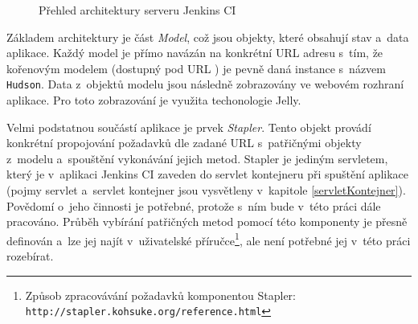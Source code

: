             \begin{figure}[ht]
                \begin{center}
                    \caption{Přehled architektury serveru Jenkins CI \cite{architectureOverview}}
                    \label{imgJenkinsArchitecture}
                \end{center}
            \end{figure}     

            Základem architektury je část \emph{Model}, což jsou objekty, které obsahují stav
            a~data aplikace. Každý model je přímo navázán na konkrétní URL adresu s~tím, že kořenovým
            modelem (dostupný pod URL \uv{/}) je pevně daná instance s~názvem \texttt{Hudson}.
            Data z~objektů modelu jsou následně zobrazovány ve webovém rozhraní aplikace.
            Pro toto zobrazování je využita techonologie Jelly.

            Velmi podstatnou součástí aplikace je prvek \emph{Stapler}. Tento objekt
            provádí konkrétní propojování požadavků dle zadané URL s~patřičnými objekty
            z~modelu a~spouštění vykonávání jejich metod. Stapler je
            jediným servletem, který je v~aplikaci Jenkins CI zaveden do
            servlet kontejneru při spuštění aplikace (pojmy servlet a~servlet kontejner 
            jsou vysvětleny v~kapitole \ref{servletKontejner}).
            Povědomí o~jeho
            činnosti je potřebné, protože s~ním bude v~této práci dále pracováno.
            Průběh vybírání patřičných metod pomocí této komponenty je přesně
            definován a~lze jej najít v~uživatelské příručce\footnote{
                Způsob zpracovávání požadavků komponentou Stapler:
                \texttt{http://stapler.kohsuke.org/reference.html}}, 
                ale není potřebné jej v~této práci rozebírat.

